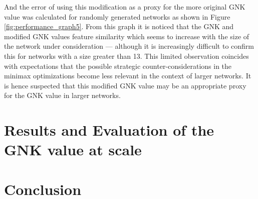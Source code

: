 And the error of using this modification as a proxy for the more original GNK value was calculated for randomly generated networks as shown in Figure \ref{fig:performance_graph5}.
From this graph it is noticed that the GNK and modified GNK values feature similarity which seems to increase with the size of the network under consideration --- although it is increasingly difficult to confirm this for networks with a size greater than 13.
This limited observation coincides with expectations that the possible strategic counter-considerations in the minimax optimizations become less relevant in the context of larger networks.
It is hence suspected that this modified GNK value may be an appropriate proxy for the GNK value in larger networks.

\iffigures

\fi



\section{Results and Evaluation of the GNK value at scale}


\section{Conclusion}


